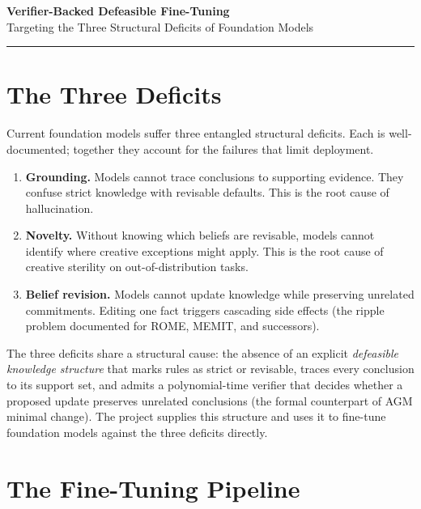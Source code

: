 \documentclass[11pt]{article}
\begin{document}
\begin{center}
{\Large\bfseries Verifier-Backed Defeasible Fine-Tuning}\\[2pt]
{\normalsize Targeting the Three Structural Deficits of Foundation Models}
\end{center}

\vspace{-3pt}\hrule\vspace{4pt}

\section*{The Three Deficits}

Current foundation models suffer three entangled structural deficits. Each is well-documented; together they account for the failures that limit deployment.

\begin{enumerate}[nosep, leftmargin=1.6em, label=\textbf{\arabic*.}]
    \item \textbf{Grounding.} Models cannot trace conclusions to supporting evidence. They confuse strict knowledge with revisable defaults. This is the root cause of hallucination.
    \item \textbf{Novelty.} Without knowing which beliefs are revisable, models cannot identify where creative exceptions might apply. This is the root cause of creative sterility on out-of-distribution tasks.
    \item \textbf{Belief revision.} Models cannot update knowledge while preserving unrelated commitments. Editing one fact triggers cascading side effects (the ripple problem documented for ROME, MEMIT, and successors).
\end{enumerate}

The three deficits share a structural cause: the absence of an explicit \emph{defeasible knowledge structure} that marks rules as strict or revisable, traces every conclusion to its support set, and admits a polynomial-time verifier that decides whether a proposed update preserves unrelated conclusions (the formal counterpart of AGM minimal change). The project supplies this structure and uses it to fine-tune foundation models against the three deficits directly.

\section*{The Fine-Tuning Pipeline}
\end{document}
